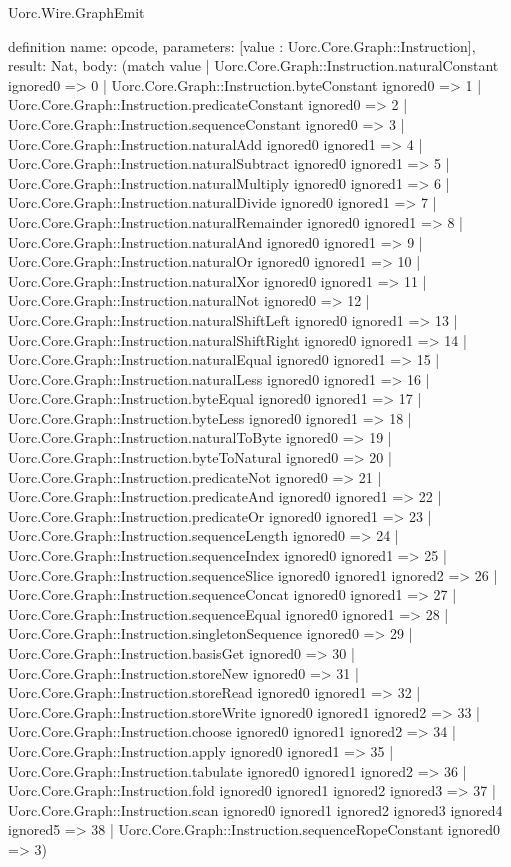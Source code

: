\begin{lexlean}{Uorc.Wire.GraphEmit}
\begin{semanticmodule}
definition{
  name: opcode,
  parameters: [value : Uorc.Core.Graph::Instruction],
  result: Nat,
  body: (match value
    | Uorc.Core.Graph::Instruction.naturalConstant ignored0 => 0
    | Uorc.Core.Graph::Instruction.byteConstant ignored0 => 1
    | Uorc.Core.Graph::Instruction.predicateConstant ignored0 => 2
    | Uorc.Core.Graph::Instruction.sequenceConstant ignored0 => 3
    | Uorc.Core.Graph::Instruction.naturalAdd ignored0 ignored1 => 4
    | Uorc.Core.Graph::Instruction.naturalSubtract ignored0 ignored1 => 5
    | Uorc.Core.Graph::Instruction.naturalMultiply ignored0 ignored1 => 6
    | Uorc.Core.Graph::Instruction.naturalDivide ignored0 ignored1 => 7
    | Uorc.Core.Graph::Instruction.naturalRemainder ignored0 ignored1 => 8
    | Uorc.Core.Graph::Instruction.naturalAnd ignored0 ignored1 => 9
    | Uorc.Core.Graph::Instruction.naturalOr ignored0 ignored1 => 10
    | Uorc.Core.Graph::Instruction.naturalXor ignored0 ignored1 => 11
    | Uorc.Core.Graph::Instruction.naturalNot ignored0 => 12
    | Uorc.Core.Graph::Instruction.naturalShiftLeft ignored0 ignored1 => 13
    | Uorc.Core.Graph::Instruction.naturalShiftRight ignored0 ignored1 => 14
    | Uorc.Core.Graph::Instruction.naturalEqual ignored0 ignored1 => 15
    | Uorc.Core.Graph::Instruction.naturalLess ignored0 ignored1 => 16
    | Uorc.Core.Graph::Instruction.byteEqual ignored0 ignored1 => 17
    | Uorc.Core.Graph::Instruction.byteLess ignored0 ignored1 => 18
    | Uorc.Core.Graph::Instruction.naturalToByte ignored0 => 19
    | Uorc.Core.Graph::Instruction.byteToNatural ignored0 => 20
    | Uorc.Core.Graph::Instruction.predicateNot ignored0 => 21
    | Uorc.Core.Graph::Instruction.predicateAnd ignored0 ignored1 => 22
    | Uorc.Core.Graph::Instruction.predicateOr ignored0 ignored1 => 23
    | Uorc.Core.Graph::Instruction.sequenceLength ignored0 => 24
    | Uorc.Core.Graph::Instruction.sequenceIndex ignored0 ignored1 => 25
    | Uorc.Core.Graph::Instruction.sequenceSlice ignored0 ignored1 ignored2 => 26
    | Uorc.Core.Graph::Instruction.sequenceConcat ignored0 ignored1 => 27
    | Uorc.Core.Graph::Instruction.sequenceEqual ignored0 ignored1 => 28
    | Uorc.Core.Graph::Instruction.singletonSequence ignored0 => 29
    | Uorc.Core.Graph::Instruction.basisGet ignored0 => 30
    | Uorc.Core.Graph::Instruction.storeNew ignored0 => 31
    | Uorc.Core.Graph::Instruction.storeRead ignored0 ignored1 => 32
    | Uorc.Core.Graph::Instruction.storeWrite ignored0 ignored1 ignored2 => 33
    | Uorc.Core.Graph::Instruction.choose ignored0 ignored1 ignored2 => 34
    | Uorc.Core.Graph::Instruction.apply ignored0 ignored1 => 35
    | Uorc.Core.Graph::Instruction.tabulate ignored0 ignored1 ignored2 => 36
    | Uorc.Core.Graph::Instruction.fold ignored0 ignored1 ignored2 ignored3 => 37
    | Uorc.Core.Graph::Instruction.scan ignored0 ignored1 ignored2 ignored3 ignored4 ignored5 => 38
    | Uorc.Core.Graph::Instruction.sequenceRopeConstant ignored0 => 3)
}


\end{semanticmodule}
\end{lexlean}
